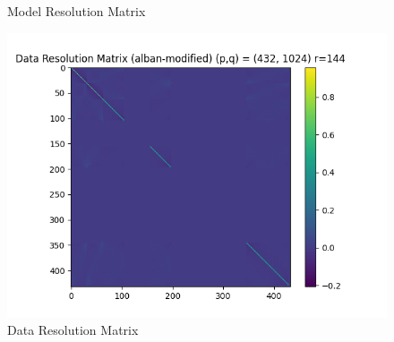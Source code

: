 \documentclass{article}
\begin{document}
\begin{itemize}
\begin{figure}[h]
    \caption{Model Resolution Matrix}
\end{figure}
\begin{figure}[h]
    \centering
    \includegraphics[width=1\textwidth]{images/outputs/datares/alban-modified.png}
    \caption{Data Resolution Matrix}
\end{figure}
\clearpage



\end{itemize}
\end{document}

